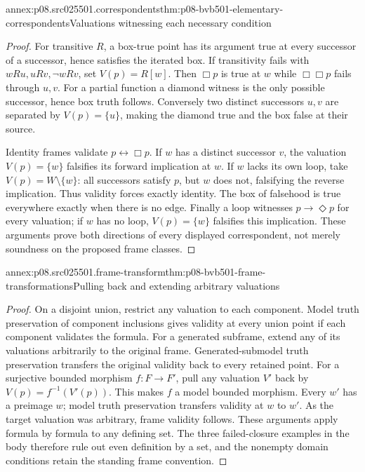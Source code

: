 \begin{annexitem}{annex:p08.src025501.correspondents}{thm:p08-bvb501-elementary-correspondents}{Valuations witnessing each necessary condition}
\begin{proof}
For transitive \(R\), a box-true point has its argument true at every
successor of a successor, hence satisfies the iterated box. If transitivity
fails with \(wRu,uRv,\neg wRv\), set \(V(p)=R[w]\).
Then \(\Box p\) is true at \(w\) while \(\Box\Box p\)
fails through \(u,v\). For a partial function a diamond witness
is the only possible successor, hence box truth follows. Conversely
two distinct successors \(u,v\) are separated by \(V(p)=\{u\}\),
making the diamond true and the box false at their source.

Identity frames validate \(p\leftrightarrow\Box p\).
If \(w\) has a distinct successor \(v\), the valuation
\(V(p)=\{w\}\) falsifies its forward implication at \(w\).
If \(w\) lacks its own loop, take \(V(p)=W\setminus\{w\}\):
all successors satisfy \(p\), but \(w\) does not, falsifying
the reverse implication. Thus validity forces exactly identity.
The box of falsehood is true everywhere exactly when there is no edge.
Finally a loop witnesses \(p\to\Diamond p\) for every valuation;
if \(w\) has no loop, \(V(p)=\{w\}\) falsifies this implication.
These arguments prove both directions of every displayed correspondent,
not merely soundness on the proposed frame classes.
\end{proof}
\end{annexitem}

\begin{annexitem}{annex:p08.src025501.frame-transform}{thm:p08-bvb501-frame-transformations}{Pulling back and extending arbitrary valuations}
\begin{proof}
On a disjoint union, restrict any valuation to each component. Model
truth preservation of component inclusions gives validity at every
union point if each component validates the formula. For a generated
subframe, extend any of its valuations arbitrarily to the original
frame. Generated-submodel truth preservation transfers the original
validity back to every retained point. For a surjective bounded
morphism \(f:F\to F'\), pull any valuation \(V'\) back by
\(V(p)=f^{-1}(V'(p))\). This makes \(f\) a model bounded
morphism. Every \(w'\) has a preimage \(w\); model truth
preservation transfers validity at \(w\) to \(w'\). As the
target valuation was arbitrary, frame validity follows. These arguments
apply formula by formula to any defining set. The three failed-closure
examples in the body therefore rule out even definition by a set, and
the nonempty domain conditions retain the standing frame convention.
\end{proof}
\end{annexitem}

